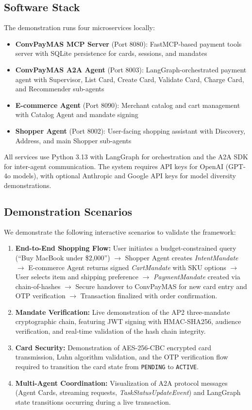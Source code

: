 \documentclass[sigconf]{aamas}
\begin{document}
\subsection*{Software Stack}
The demonstration runs four microservices locally:
\begin{itemize}
    \item \textbf{ConvPayMAS MCP Server} (Port 8080): FastMCP-based payment tools server with SQLite persistence for cards, sessions, and mandates
    \item \textbf{ConvPayMAS A2A Agent} (Port 8003): LangGraph-orchestrated payment agent with Supervisor, List Card, Create Card, Validate Card, Charge Card, and Recommender sub-agents
    \item \textbf{E-commerce Agent} (Port 8090): Merchant catalog and cart management with Catalog Agent and mandate signing
    \item \textbf{Shopper Agent} (Port 8002): User-facing shopping assistant with Discovery, Address, and main Shopper sub-agents
\end{itemize}

All services use Python 3.13 with LangGraph for orchestration and the A2A SDK for inter-agent communication. The system requires API keys for OpenAI (GPT-4o models), with optional Anthropic and Google API keys for model diversity demonstrations.

\subsection*{Demonstration Scenarios}
We demonstrate the following interactive scenarios to validate the framework:
\begin{enumerate}
    \item \textbf{End-to-End Shopping Flow:} User initiates a budget-constrained query (``Buy MacBook under \$2,000'') $\rightarrow$ Shopper Agent creates \textit{IntentMandate} $\rightarrow$ E-commerce Agent returns signed \textit{CartMandate} with SKU options $\rightarrow$ User selects item and shipping preference $\rightarrow$ \textit{PaymentMandate} created via chain-of-hashes $\rightarrow$ Secure handover to ConvPayMAS for new card entry and OTP verification $\rightarrow$ Transaction finalized with order confirmation.
    
    \item \textbf{Mandate Verification:} Live demonstration of the AP2 three-mandate cryptographic chain, featuring JWT signing with HMAC-SHA256, audience verification, and real-time validation of the hash chain integrity.
    
    \item \textbf{Card Security:} Demonstration of AES-256-CBC encrypted card transmission, Luhn algorithm validation, and the OTP verification flow required to transition the card state from \texttt{PENDING} to \texttt{ACTIVE}.
    
    \item \textbf{Multi-Agent Coordination:} Visualization of A2A protocol messages (Agent Cards, streaming requests, \textit{TaskStatusUpdateEvent}) and LangGraph state transitions occurring during a live transaction.
    
\end{enumerate}
\end{document}
